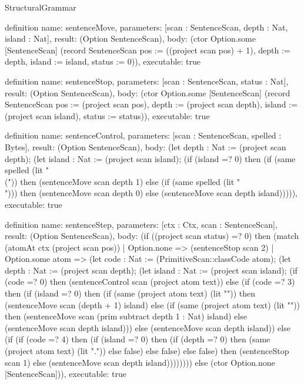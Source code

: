 \begin{lexlean}{StructuralGrammar}
\begin{semanticmodule}
{{definition{
  name: sentenceMove,
  parameters: [scan : SentenceScan, depth : Nat, island : Nat],
  result: (Option SentenceScan),
  body: (ctor Option.some [SentenceScan] (record SentenceScan {pos := ((project scan pos) + 1), depth := depth, island := island, status := 0})),
  executable: true
}

definition{
  name: sentenceStop,
  parameters: [scan : SentenceScan, status : Nat],
  result: (Option SentenceScan),
  body: (ctor Option.some [SentenceScan] (record SentenceScan {pos := (project scan pos), depth := (project scan depth), island := (project scan island), status := status})),
  executable: true
}

definition{
  name: sentenceControl,
  parameters: [scan : SentenceScan, spelled : Bytes],
  result: (Option SentenceScan),
  body: (let depth : Nat := (project scan depth); (let island : Nat := (project scan island); (if (island =? 0) then (if (same spelled (lit "\\(")) then (sentenceMove scan depth 1) else (if (same spelled (lit "\\[")) then (sentenceMove scan depth 2) else (if (if (depth =? 0) then (if (same spelled (lit "\\begin")) then true else (same spelled (lit "\\end"))) else false) then (sentenceStop scan 2) else (sentenceMove scan depth 0)))) else (if (if (island =? 1) then (same spelled (lit "\\)")) else (same spelled (lit "\\]"))) then (sentenceMove scan depth 0) else (sentenceMove scan depth island))))),
  executable: true
}

definition{
  name: sentenceStep,
  parameters: [ctx : Ctx, scan : SentenceScan],
  result: (Option SentenceScan),
  body: (if ((project scan status) =? 0) then (match (atomAt ctx (project scan pos))
    | Option.none => (sentenceStop scan 2)
    | Option.some atom => (let code : Nat := (PrimitiveScan::classCode atom); (let depth : Nat := (project scan depth); (let island : Nat := (project scan island); (if (code =? 0) then (sentenceControl scan (project atom text)) else (if (code =? 3) then (if (island =? 0) then (if (same (project atom text) (lit "{")) then (sentenceMove scan (depth + 1) island) else (if (same (project atom text) (lit "}")) then (sentenceMove scan (prim subtract depth 1 : Nat) island) else (sentenceMove scan depth island))) else (sentenceMove scan depth island)) else (if (if (code =? 4) then (if (island =? 0) then (if (depth =? 0) then (same (project atom text) (lit ".")) else false) else false) else false) then (sentenceStop scan 1) else (sentenceMove scan depth island)))))))) else (ctor Option.none [SentenceScan])),
  executable: true
}

}}
\end{semanticmodule}
\end{lexlean}
